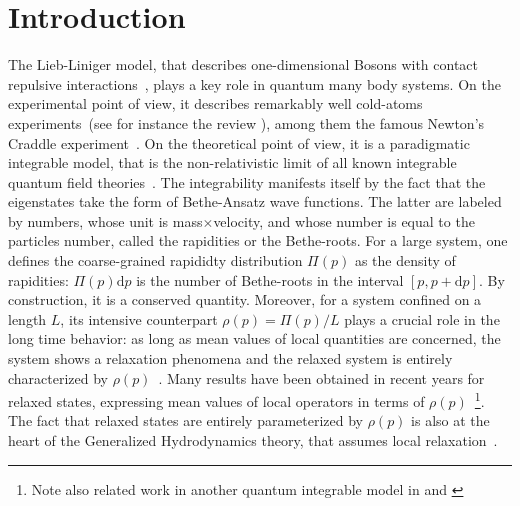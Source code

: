 \documentclass[submission,Phys,10pt]{SciPost}%
\begin{document}
\section{Introduction}
The Lieb-Liniger model, that describes one-dimensional Bosons with contact repulsive interactions~\cite{lieb_exact_1963},  
plays a key role in quantum many body systems. On the experimental point of view, it describes remarkably 
well cold-atoms experiments~(see for instance the review \cite{bouchoule_generalized_2022}), among them 
the famous Newton's Craddle experiment~\cite{kinoshita_quantum_2006}.
On the theoretical point of view, it is a paradigmatic integrable model, that is the non-relativistic limit 
of all known integrable quantum field theories~\cite{bastianello_non_2016,bastianello_non_2017}.
The integrability
manifests itself by the fact that the eigenstates take the form of Bethe-Ansatz wave functions.
The latter are labeled by numbers, whose unit is mass$\times$velocity, and
whose number is equal to the particles number, called
the rapidities or the Bethe-roots.
For a large system, one defines the coarse-grained
rapididty distribution $\Pi(p)$ as the density of rapidities: $\Pi(p) \mathrm{d}p$ is the number of Bethe-roots in the interval $[p,p+\mathrm{d}p]$. 
By construction,
it is a conserved quantity.  Moreover, for a system confined on a length $L$,
its intensive counterpart $\rho(p)=\Pi(p)/L$
plays a crucial role in the long time behavior:
as long as mean values of local quantities are concerned,
the system shows a relaxation phenomena and the relaxed system is
entirely characterized by $\rho(p)$~\cite{caux_time_2013,bouchoule_generalized_2022,essler_generalized_2015}.
Many results have been obtained in recent years for relaxed states, expressing
mean values of local operators in terms
of $\rho(p)$~\cite{mussardo_infinite-time_2013,bastianello_exact_2018}\footnote{Note also 
related work in another quantum integrable model in\cite{negro_one-point_2013} and \cite{negro_sinhgordon_2014}}.
The fact that relaxed states are entirely parameterized by $\rho(p)$ is
also at the heart of the Generalized
Hydrodynamics theory, that assumes local
relaxation~\cite{castro-alvaredo_emergent_2016,bertini_transport_2016,bouchoule_generalized_2022}. 
\end{document}
